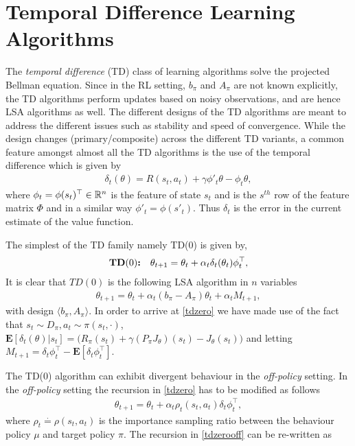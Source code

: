 \section{Temporal Difference Learning Algorithms}
The \emph{temporal difference} (TD) class of learning algorithms solve the projected Bellman equation. Since in the RL setting, $b_\pi$ and $A_\pi$ are not known explicitly, the TD algorithms perform updates based on noisy observations, and are hence LSA algorithms as well. The different designs of the TD algorithms are meant to address the different issues such as stability and speed of convergence.
While the design changes (primary/composite) across the different TD variants, a common feature amongst almost all the TD algorithms is the use of the temporal difference which is given by
\begin{align}\label{td}
\delta_t(\theta)=R(s_t,a_t)+\gamma \phi'_t\theta-\phi_t\theta,
\end{align}
where $\phi_t=\phi(s_t)^\top \in \mathbb{R}^n$ is the feature of state $s_t$ and is the $s^{th}$ row of the feature matrix $\Phi$ and in a similar way $\phi'_t=\phi(s'_t)$. Thus $\delta_t$ is the error in the current estimate of the value function.\par
The simplest of the TD family namely TD($0$) is given by,
\begin{align}\label{tdzero}
&\textbf{TD$(0)$:}&\theta_{t+1}=\theta_t+\alpha_t\delta_t(\theta_t)\phi_t^\top,
\end{align}
It is clear that $TD(0)$ is the following LSA algorithm in $n$ variables
\begin{align}\label{tdzero}
\theta_{t+1}=\theta_t+\alpha_t(b_\pi-A_\pi)\theta_t+\alpha_t M_{t+1},
\end{align} 
with design $\langle b_\pi,A_\pi \rangle$. In order to arrive at \eqref{tdzero} we have made use of the fact that $s_t\sim D_\pi, a_t\sim\pi(s_t,\cdot)$, $\mathbf{E}[\delta_t(\theta)|s_t]= \big(R_\pi(s_t)+\gamma (P_\pi J_\theta)(s_t) -J_\theta(s_t)\big)$ and letting $M_{t+1}=\delta_t\phi_t^\top-\mathbf{E}[\delta_t\phi_t^\top]$.\par
The TD($0$) algorithm can exhibit divergent behaviour in the \emph{off-policy} setting. In the \emph{off-policy} setting the recursion in \eqref{tdzero} has to be modified as follows
\begin{align}\label{tdzerooff}
\theta_{t+1}=\theta_t+\alpha_t\rho_t(s_t,a_t)\delta_t\phi_t^\top,
\end{align}
where $\rho_t\stackrel{\cdot}{=}\rho(s_t,a_t)$ is the importance sampling ratio between the behaviour policy $\mu$ and target policy $\pi$. The recursion in \eqref{tdzerooff} can be re-written as
